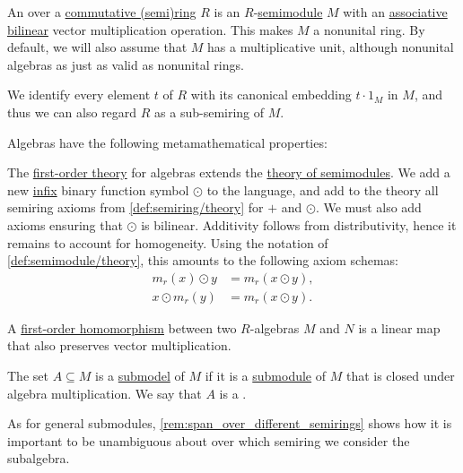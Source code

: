 \begin{definition}\label{def:algebra_over_semiring}\mimprovised
  An  over a \hyperref[def:semiring/commutative]{commutative (semi)ring} \( R \) is an \( R \)-\hyperref[def:semimodule]{semimodule} \( M \) with an \hyperref[def:binary_operation/associative]{associative} \hyperref[def:multilinear_function]{bilinear} vector multiplication operation. This makes \( M \) a nonunital ring. By default, we will also assume that \( M \) has a multiplicative unit, although nonunital algebras as just as valid as nonunital rings.

  We identify every element \( t \) of \( R \) with its canonical embedding \( t \cdot 1_M \) in \( M \), and thus we can also regard \( R \) as a sub-semiring of \( M \).

  Algebras have the following metamathematical properties:
  \begin{thmenum}
     The \hyperref[def:first_order_theory]{first-order theory} for algebras extends the \hyperref[def:semimodule/theory]{theory of semimodules}. We add a new \hyperref[rem:first_order_formula_conventions/infix]{infix} binary function symbol \( \odot \) to the language, and add to the theory all semiring axioms from \cref{def:semiring/theory} for \( + \) and \( \odot \). We must also add axioms ensuring that \( \odot \) is bilinear. Additivity follows from distributivity, hence it remains to account for homogeneity. Using the notation of \cref{def:semimodule/theory}, this amounts to the following axiom schemas:
    \begin{align*}
      m_r(x) \odot y &= m_r(x \odot y), \\
      x \odot m_r(y) &= m_r(x \odot y).
    \end{align*}

     A \hyperref[def:first_order_homomorphism]{first-order homomorphism} between two \( R \)-algebras \( M \) and \( N \) is a linear map that also preserves vector multiplication.

     The set \( A \subseteq M \) is a \hyperref[def:first_order_submodel]{submodel} of \( M \) if it is a \hyperref[def:monoid/submodel]{submodule} of \( M \) that is closed under algebra multiplication. We say that \( A \) is a .

    As for general submodules, \cref{rem:span_over_different_semirings} shows how it is important to be unambiguous about over which semiring we consider the subalgebra.


\end{thmenum}
\end{definition}
